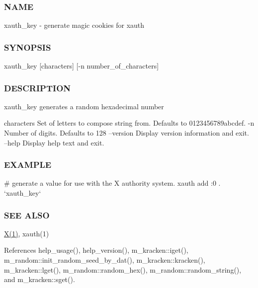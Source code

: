 \subsubsection*{N\+A\+ME}

xauth\+\_\+key -\/ generate magic cookies for xauth \subsubsection*{S\+Y\+N\+O\+P\+S\+IS}

xauth\+\_\+key \mbox{[}characters\mbox{]} \mbox{[}-\/n number\+\_\+of\+\_\+characters\mbox{]} \subsubsection*{D\+E\+S\+C\+R\+I\+P\+T\+I\+ON}

xauth\+\_\+key generates a random hexadecimal number

characters Set of letters to compose string from. Defaults to \textquotesingle{}0123456789abcdef\textquotesingle{}. -\/n Number of digits. Defaults to 128 --version Display version information and exit. --help Display help text and exit. \subsubsection*{E\+X\+A\+M\+P\+LE}

\begin{DoxyVerb}# generate a value for use with the X authority system.
xauth add :0 . `xauth_key`
\end{DoxyVerb}
 \subsubsection*{S\+EE A\+L\+SO}

\hyperlink{intro__blas1_83_8txt_a7af7e1e13fc78374475d1be13503ee6e}{X(1)}, xauth(1) 

References help\+\_\+usage(), help\+\_\+version(), m\+\_\+kracken\+::iget(), m\+\_\+random\+::init\+\_\+random\+\_\+seed\+\_\+by\+\_\+dat(), m\+\_\+kracken\+::kracken(), m\+\_\+kracken\+::lget(), m\+\_\+random\+::random\+\_\+hex(), m\+\_\+random\+::random\+\_\+string(), and m\+\_\+kracken\+::sget().

